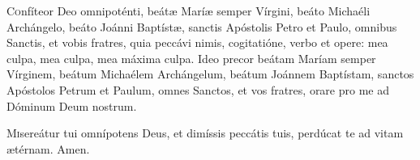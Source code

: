 

\cleardoublepage
\thispagestyle{empty}
 
{}








\lettrine{C}{o}nfíteor Deo omnipoténti, beátæ Maríæ semper Vírgini, beáto Michaéli Archángelo, beáto Joánni Baptístæ, sanctis Apóstolis Petro et Paulo, omnibus Sanctis, et vobis fratres, quia peccávi nimis, cogitatióne, verbo et opere: mea culpa, mea culpa, mea máxima culpa. Ideo precor beátam Maríam semper Vírginem, beátum Michaélem Archángelum, beátum Joánnem Baptístam, sanctos Apóstolos Petrum et Paulum, omnes Sanctos, et vos fratres, orare pro me ad Dóminum Deum nostrum.


\lettrine{M}{i}sereátur tui omnípotens Deus, et dimíssis peccátis tuis, perdúcat te ad vitam ætérnam. \rr Amen.


